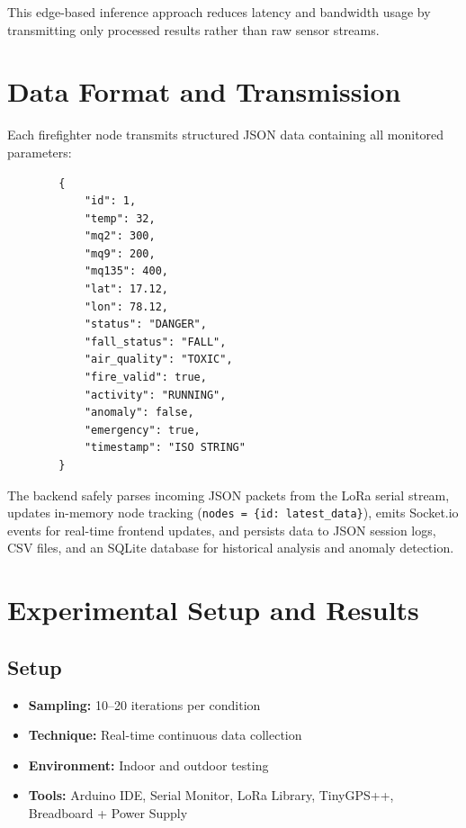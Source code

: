 \documentclass[conference]{IEEEtran}
\begin{document}
	This edge-based inference approach reduces latency and bandwidth usage by
	transmitting only processed results rather than raw sensor streams.
	
	\section{Data Format and Transmission}
	
	Each firefighter node transmits structured JSON data containing all monitored
	parameters:
	
	\begin{lstlisting}
		{
			"id": 1,
			"temp": 32,
			"mq2": 300,
			"mq9": 200,
			"mq135": 400,
			"lat": 17.12,
			"lon": 78.12,
			"status": "DANGER",
			"fall_status": "FALL",
			"air_quality": "TOXIC",
			"fire_valid": true,
			"activity": "RUNNING",
			"anomaly": false,
			"emergency": true,
			"timestamp": "ISO STRING"
		}
	\end{lstlisting}
	
	The backend safely parses incoming JSON packets from the LoRa serial stream,
	updates in-memory node tracking (\texttt{nodes = \{id: latest\_data\}}), emits
	Socket.io events for real-time frontend updates, and persists data to JSON
	session logs, CSV files, and an SQLite database for historical analysis and
	anomaly detection.
	
	\section{Experimental Setup and Results}
	
	\subsection{Setup}
	
	\begin{itemize}
		\item \textbf{Sampling:} 10--20 iterations per condition
		\item \textbf{Technique:} Real-time continuous data collection
		\item \textbf{Environment:} Indoor and outdoor testing
		\item \textbf{Tools:} Arduino IDE, Serial Monitor, LoRa Library,
		TinyGPS++, Breadboard + Power Supply
	\end{itemize}
	
\end{document}
